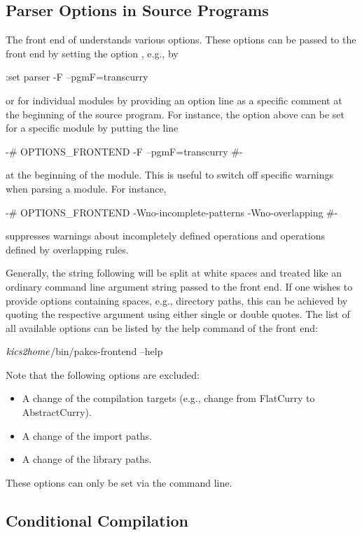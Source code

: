 \subsection{Parser Options in Source Programs}

The front end of \CYS understands various options.
These options can be passed to the front end by setting
the \CYS option , e.g., by
%
\begin{curry}
:set parser -F --pgmF=transcurry
\end{curry}
%
or for individual modules by providing an option line as a specific
comment at the beginning of the source program.
For instance, the option above can be set for a specific module
by putting the line
%
\begin{curry}
{-# OPTIONS_FRONTEND -F --pgmF=transcurry #-}
\end{curry}
%
at the beginning of the module.
This is useful to switch off specific warnings when parsing a module.
For instance, 
%
\begin{curry}
{-# OPTIONS_FRONTEND -Wno-incomplete-patterns -Wno-overlapping #-}
\end{curry}
%
suppresses warnings about incompletely defined operations
and operations defined by overlapping rules.

Generally, the string following 
will be split at white spaces and treated like an ordinary
command line argument string passed to the front end.
If one wishes to provide options containing spaces, e.g., directory paths,
this can be achieved by quoting the respective argument
using either single or double quotes.
The list of all available options can be listed by the help command
of the front end:
\begin{curry}
$\mbox{\textit{kics2home}}$/bin/pakcs-frontend --help
\end{curry}
%
Note that the following options are excluded:
\begin{itemize}
\item A change of the compilation targets
      (e.g., change from FlatCurry to AbstractCurry).
\item A change of the import  paths.
\item A change of the library paths.
\end{itemize}
%
These options can only be set via the command line.


\subsection{Conditional Compilation}


